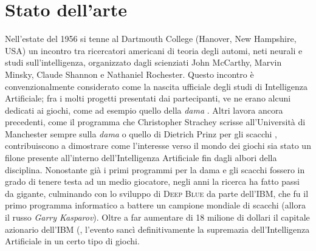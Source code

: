 \chapter{Stato dell'arte}
\graphicspath{{Chapter3/Chapter3Figs/PNG/}{Chapter3/Chapter3Figs/PDF/}{Chapter3/Chapter3Figs/}}

Nell'estate del 1956 si tenne al Dartmouth College (Hanover, New Hampshire, USA) un incontro tra ricercatori americani di teoria degli automi, neti neurali e studi sull'intelligenza, organizzato dagli scienziati John McCarthy, Marvin Minsky, Claude Shannon e Nathaniel Rochester.
Questo incontro è convenzionalmente considerato come la nascita ufficiale degli studi di Intelligenza Artificiale; fra i molti progetti presentati dai partecipanti, ve ne erano alcuni dedicati ai giochi, come ad esempio quello della \emph{dama} \cite{randw}.
Altri lavora ancora precedenti, come il programma che Christopher Strachey scrisse all'Università di Manchester sempre sulla \emph{dama} o quello di Dietrich Prinz per gli scacchi \cite{historyofcomputing}, contribuiscono a dimostrare come l'interesse verso il mondo dei giochi sia stato un filone presente all'interno dell'Intelligenza Artificiale fin dagli albori della disciplina.
Nonostante già i primi programmi per la dama e gli scacchi fossero in grado di tenere testa ad un medio giocatore, negli anni la ricerca ha fatto passi da gigante, culminando con lo sviluppo di \textsc{Deep Blue} da parte dell'\textsc{IBM}, che fu il primo programma informatico a battere un campione mondiale di scacchi (allora il russo \emph{Garry Kasparov}).
Oltre a far aumentare di 18 milione di dollari il capitale azionario dell'\textsc{IBM} (\cite{randw}, l'evento sancì definitivamente la supremazia dell'Intelligenza Artificiale in un certo tipo di giochi.




